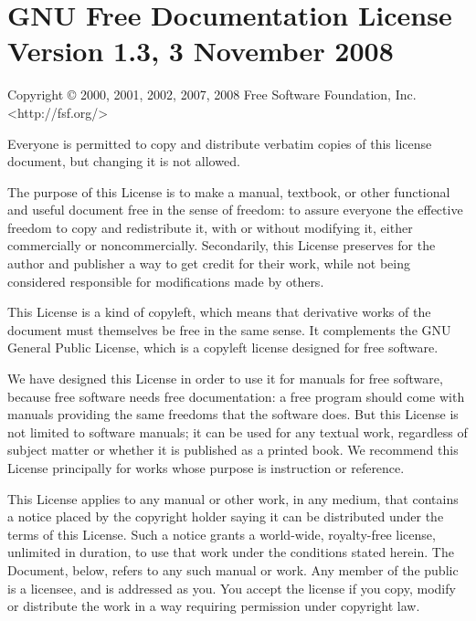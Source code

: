 

\chapter{GNU Free Documentation License Version 1.3, 3 November 2008}
%
\begin{BookLicense}
Copyright © 2000, 2001, 2002, 2007, 2008 Free Software Foundation, Inc. \textless{}http://fsf.org/\textgreater{}

Everyone is permitted to copy and distribute verbatim copies of this license document, but changing it is not allowed.

The purpose of this License is to make a manual, textbook, or other functional and useful document \BookQuoteChar{}free\BookQuoteChar{} in the sense of freedom: to assure everyone the effective freedom to copy and redistribute it, with or without modifying it, either commercially or noncommercially. Secondarily, this License preserves for the author and publisher a way to get credit for their work, while not being considered responsible for modifications made by others.

This License is a kind of \BookQuoteChar{}copyleft\BookQuoteChar{}, which means that derivative works of the document must themselves be free in the same sense. It complements the GNU General Public License, which is a copyleft license designed for free software.

We have designed this License in order to use it for manuals for free software, because free software needs free documentation: a free program should come with manuals providing the same freedoms that the software does. But this License is not limited to software manuals; it can be used for any textual work, regardless of subject matter or whether it is published as a printed book. We recommend this License principally for works whose purpose is instruction or reference.

This License applies to any manual or other work, in any medium, that contains a notice placed by the copyright holder saying it can be distributed under the terms of this License. Such a notice grants a world-wide, royalty-free license, unlimited in duration, to use that work under the conditions stated herein. The \BookQuoteChar{}Document\BookQuoteChar{}, below, refers to any such manual or work. Any member of the public is a licensee, and is addressed as \BookQuoteChar{}you\BookQuoteChar{}. You accept the license if you copy, modify or distribute the work in a way requiring permission under copyright law.


\end{BookLicense}

